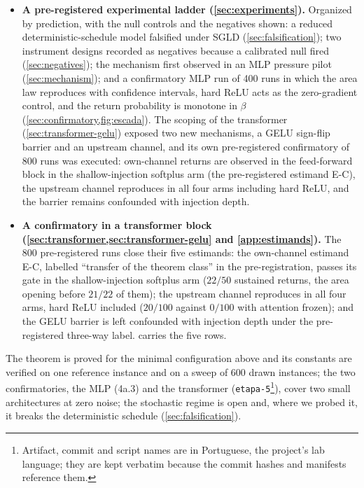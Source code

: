 \documentclass[11pt]{article}
\theoremstyle{definition}
\theoremstyle{remark}
\begin{document}
\begin{itemize}
\item \textbf{A pre-registered experimental ladder (\cref{sec:experiments}).}
Organized by prediction, with the null controls and the negatives shown: a
reduced deterministic-schedule model falsified under SGLD
(\cref{sec:falsification}); two instrument designs recorded as negatives because
a calibrated null fired (\cref{sec:negatives}); the mechanism first observed in
an MLP pressure pilot (\cref{sec:mechanism}); and a confirmatory MLP run of 400
runs in which the area law reproduces with confidence intervals, hard ReLU acts
as the zero-gradient control, and the return probability is monotone in $\beta$
(\cref{sec:confirmatory,fig:escada}). The scoping of the transformer
(\cref{sec:transformer-gelu}) exposed two new mechanisms, a GELU sign-flip barrier and
an upstream channel, and its own pre-registered confirmatory of 800 runs was
executed: own-channel returns are observed in the feed-forward block in the
shallow-injection softplus arm (the pre-registered estimand E-C), the upstream
channel reproduces in all four arms including hard ReLU, and the barrier
remains confounded with injection depth.

\item \textbf{A confirmatory in a transformer block
(\cref{sec:transformer,sec:transformer-gelu} and \cref{app:estimands}).} The
800 pre-registered runs close their five estimands: the own-channel estimand
E-C, labelled ``transfer of the theorem class'' in the pre-registration, passes
its gate in the shallow-injection softplus arm ($22/50$ sustained returns, the
area opening before $21/22$ of them); the upstream channel
reproduces in all four arms, hard ReLU included ($20/100$ against $0/100$ with
attention frozen); and the GELU barrier is left confounded with injection depth
under the pre-registered three-way label.  carries the five rows.
\end{itemize}

The theorem is proved for the minimal configuration above and its constants
are verified on one reference instance and on a sweep of 600 drawn instances;
the two confirmatories, the MLP (4a.3) and the transformer
(\texttt{etapa-5}\footnote{Artifact, commit and script names are in
Portuguese, the project's lab language; they are kept verbatim because the
commit hashes and manifests reference them.}), cover two small architectures
at zero noise; the stochastic regime is open and, where we probed it, it
breaks the deterministic schedule (\cref{sec:falsification}).
\end{document}
